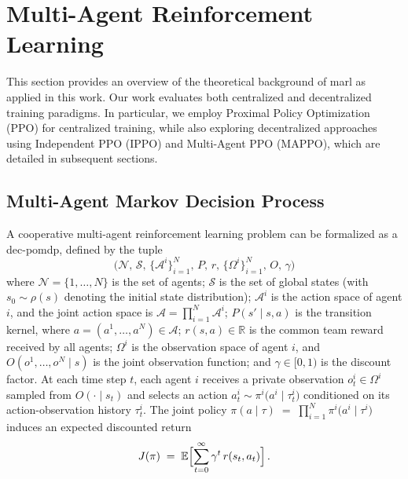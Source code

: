 \section{Multi-Agent Reinforcement Learning}
This section provides an overview of the theoretical background of \gls{marl} as applied in this work. Our work evaluates both centralized and decentralized training paradigms. In particular, we employ Proximal Policy Optimization (PPO) for centralized training, while also exploring decentralized approaches using Independent PPO (IPPO) and Multi-Agent PPO (MAPPO), which are detailed in subsequent sections.
\subsection{Multi-Agent Markov Decision Process}
A cooperative multi-agent reinforcement learning problem can be formalized as a \gls{dec-pomdp}\cite{oliehoek_concise_2016}, defined by the tuple
\[
  \bigl(\mathcal{N},\,\mathcal{S},\,\{\mathcal{A}^i\}_{i=1}^N,\,P,\,r,\,\{\Omega^i\}_{i=1}^N,\,O,\,\gamma\bigr)
\]
where $\mathcal{N}=\{1,\dots,N\}$ is the set of agents; $\mathcal{S}$ is the set of global states (with $s_0\sim\rho(s)$ denoting the initial state distribution); $\mathcal{A}^i$ is the action space of agent $i$, and the joint action space is $\mathcal{A} = \prod_{i=1}^N \mathcal{A}^i$; $P(s' \mid s, a)$ is the transition kernel, where $a=(a^1,\dots,a^N)\in\mathcal{A}$; $r(s,a)\in\mathbb{R}$ is the common team reward received by all agents; $\Omega^i$ is the observation space of agent $i$, and $O(o^1,\dots,o^N\mid s)$ is the joint observation function; and $\gamma\in[0,1)$ is the discount factor.
At each time step $t$, each agent $i$ receives a private observation $o^i_t \in \Omega^i$ sampled from $O(\cdot\mid s_t)$ and selects an action 
$a^i_t \sim \pi^i\bigl(a^i \mid \tau^i_t\bigr)$
conditioned on its action-observation history $\tau^i_t$. The joint policy 
$\pi(a\mid \tau) \;=\; \prod_{i=1}^N \pi^i\bigl(a^i\mid \tau^i\bigr)$
induces an expected discounted return
\[
  J(\pi) \;=\; \mathbb{E}\Bigl[\sum_{t=0}^\infty \gamma^t\,r(s_t, a_t)\Bigr]\,. 
\]

